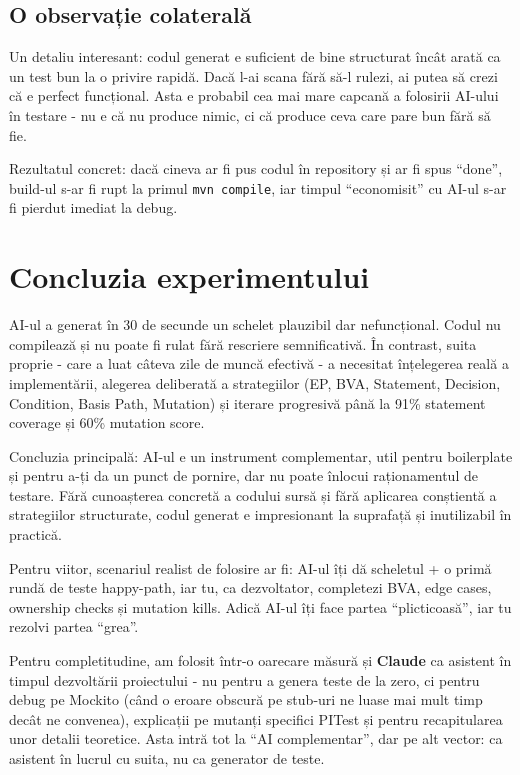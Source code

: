 \subsection{O observație colaterală}

Un detaliu interesant: codul generat e suficient de bine structurat încât arată ca un test bun la o privire rapidă. Dacă l-ai scana fără să-l rulezi, ai putea să crezi că e perfect funcțional. Asta e probabil cea mai mare capcană a folosirii AI-ului în testare - nu e că nu produce nimic, ci că produce ceva care pare bun fără să fie.

Rezultatul concret: dacă cineva ar fi pus codul în repository și ar fi spus \enquote{done}, build-ul s-ar fi rupt la primul \texttt{mvn compile}, iar timpul \enquote{economisit} cu AI-ul s-ar fi pierdut imediat la debug.

\section{Concluzia experimentului}

AI-ul a generat în 30 de secunde un schelet plauzibil dar nefuncțional. Codul nu compilează și nu poate fi rulat fără rescriere semnificativă. În contrast, suita proprie - care a luat câteva zile de muncă efectivă - a necesitat înțelegerea reală a implementării, alegerea deliberată a strategiilor (EP, BVA, Statement, Decision, Condition, Basis Path, Mutation) și iterare progresivă până la 91\% statement coverage și 60\% mutation score.

Concluzia principală: AI-ul e un instrument complementar, util pentru boilerplate și pentru a-ți da un punct de pornire, dar nu poate înlocui raționamentul de testare. Fără cunoașterea concretă a codului sursă și fără aplicarea conștientă a strategiilor structurate, codul generat e impresionant la suprafață și inutilizabil în practică.

Pentru viitor, scenariul realist de folosire ar fi: AI-ul îți dă scheletul + o primă rundă de teste happy-path, iar tu, ca dezvoltator, completezi BVA, edge cases, ownership checks și mutation kills. Adică AI-ul îți face partea \enquote{plicticoasă}, iar tu rezolvi partea \enquote{grea}.

Pentru completitudine, am folosit într-o oarecare măsură și \textbf{Claude} \cite{claude_ref} ca asistent în timpul dezvoltării proiectului - nu pentru a genera teste de la zero, ci pentru debug pe Mockito (când o eroare obscură pe stub-uri ne luase mai mult timp decât ne convenea), explicații pe mutanți specifici PITest și pentru recapitularea unor detalii teoretice. Asta intră tot la \enquote{AI complementar}, dar pe alt vector: ca asistent în lucrul cu suita, nu ca generator de teste.
